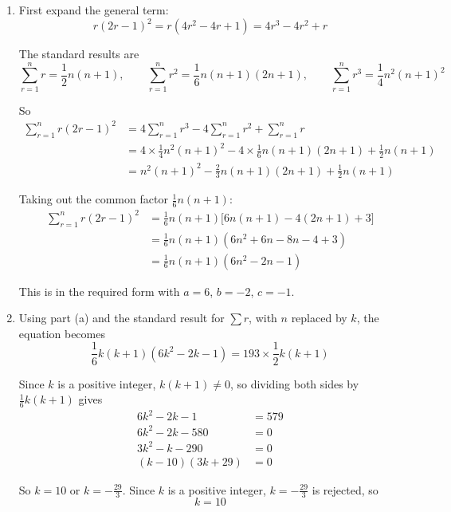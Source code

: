 \documentclass[leqno]{article}
\begin{document}
\begin{enumerate}[
  label=\textbf{\arabic*.},
  leftmargin=*,
  topsep=0pt,
  partopsep=0pt,
  parsep=0pt
]
\vspace*{10pt}

\begin{djsSolution}
\begin{enumerate}[label=\textbf{(\alph*)}, start=1]
  \item First expand the general term:
\[
r(2r-1)^2 = r\left(4r^2-4r+1\right) = 4r^3-4r^2+r
\]

The standard results are
\[
\sum_{r=1}^{n} r=\frac12 n(n+1),\qquad \sum_{r=1}^{n} r^2=\frac16 n(n+1)(2n+1),\qquad \sum_{r=1}^{n} r^3=\frac14 n^2(n+1)^2
\]

So
\begin{align*}
\sum_{r=1}^{n} r(2r-1)^2 &= 4\sum_{r=1}^{n} r^3 - 4\sum_{r=1}^{n} r^2 + \sum_{r=1}^{n} r\\
&= 4\times\frac14 n^2(n+1)^2 - 4\times\frac16 n(n+1)(2n+1) + \frac12 n(n+1)\\
&= n^2(n+1)^2 - \frac23 n(n+1)(2n+1) + \frac12 n(n+1)
\end{align*}

Taking out the common factor \(\frac16 n(n+1)\):
\begin{align*}
\sum_{r=1}^{n} r(2r-1)^2 &= \frac16 n(n+1)\big[6n(n+1) - 4(2n+1) + 3\big]\\
&= \frac16 n(n+1)\left(6n^2+6n-8n-4+3\right)\\
&= \frac16 n(n+1)\left(6n^2-2n-1\right)
\end{align*}

This is in the required form with \(a=6\), \(b=-2\), \(c=-1\).

  \item Using part (a) and the standard result for \(\sum r\), with \(n\) replaced by \(k\), the equation becomes
\[
\frac16 k(k+1)\left(6k^2-2k-1\right) = 193\times\frac12 k(k+1)
\]

Since \(k\) is a positive integer, \(k(k+1)\neq 0\), so dividing both sides by \(\frac16 k(k+1)\) gives
\begin{align*}
6k^2-2k-1 &= 579\\
6k^2-2k-580 &= 0\\
3k^2-k-290 &= 0\\
(k-10)(3k+29) &= 0
\end{align*}

So \(k=10\) or \(k=-\frac{29}{3}\). Since \(k\) is a positive integer, \(k=-\frac{29}{3}\) is rejected, so
\[
k=10
\]

\end{enumerate}
\end{djsSolution}


\end{enumerate}
\end{document}
